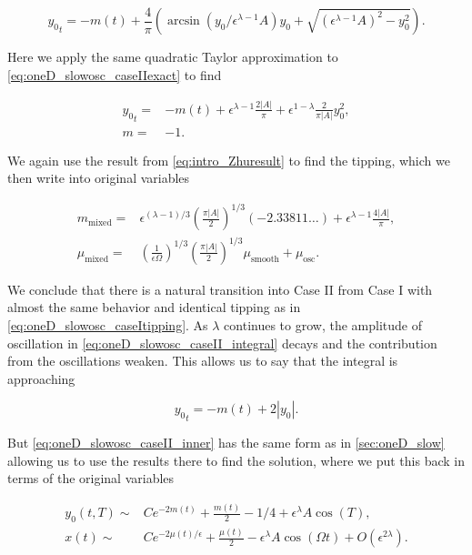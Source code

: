 \begin{equation}\label{eq:oneD_slowosc_caseIIexact}
{y_0}_t=-m(t)+\frac{4}{\pi}\left(\arcsin(y_0/\epsilon^{\lambda-1}A)y_0+\sqrt{(\epsilon^{\lambda-1}A)^2-y_0^2}\right).
\end{equation}

Here we apply the same quadratic Taylor approximation to \eqref{eq:oneD_slowosc_caseIIexact} to find

\begin{equation}\label{eq:oneD_slowosc_caseII_taylor}
\begin{aligned}
{y_0}_t=&-m(t)+\epsilon^{\lambda-1}\frac{2|A|}{\pi}+\epsilon^{1-\lambda}\frac{2}{\pi |A|}y_0^2,\\
m=&-1.
\end{aligned}
\end{equation}

We again use the result from \eqref{eq:intro_Zhuresult} to find the tipping, which we then write into original variables

\begin{equation*}
\begin{aligned}
m_{\text{mixed}}=&\epsilon^{(\lambda-1)/3}\left(\frac{\pi |A|}{2}\right)^{1/3}(-2.33811\ldots)+\epsilon^{\lambda-1}\frac{4|A|}{\pi},\\
\mu_{\text{mixed}}=&\left(\frac{1}{\epsilon\Omega}\right)^{1/3}\left(\frac{\pi |A|}{2}\right)^{1/3} \mu_{\text{smooth}}+\mu_{\text{osc}}.
\end{aligned}
\end{equation*}

We conclude that there is a natural transition into Case II from Case I with almost the same behavior and identical tipping as in \eqref{eq:oneD_slowosc_caseItipping}. As $\lambda$ continues to grow, the amplitude of oscillation in \eqref{eq:oneD_slowosc_caseII_integral} decays and the contribution from the oscillations weaken. This allows us to say that the integral is approaching

\begin{equation}\label{eq:oneD_slowosc_caseII_inner}
{y_0}_t = -m(t) +2|y_0|.
\end{equation}

But \eqref{eq:oneD_slowosc_caseII_inner} has the same form as in \autoref{sec:oneD_slow} allowing us to use the results there to find the solution, where we put this back in terms of the original variables

\begin{equation}\label{eq:oneD_slowosc_caseIIsoln}
\begin{aligned}
y_0(t,T)\sim& C e^{-2m(t)}+\frac{m(t)}{2}-1/4 +\epsilon^\lambda A\cos(T),\\
x(t)\sim& C e^{-2\mu(t)/\epsilon}+\frac{\mu(t)}{2} -\epsilon^\lambda A\cos(\Omega t)+O(\epsilon^{2\lambda}).
\end{aligned}
\end{equation}


